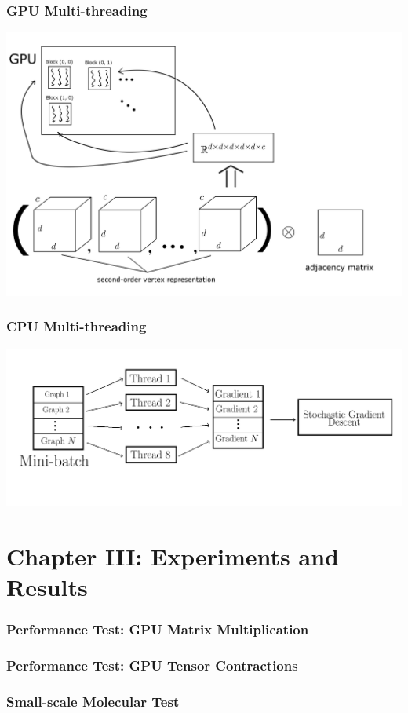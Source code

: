 \documentclass{beamer}
\begin{document}
\begin{frame}
\frametitle{GPU Multi-threading}
\includegraphics[width=\textwidth]{GPU_multithreading.png}
\end{frame}

\begin{frame}
\frametitle{CPU Multi-threading}
\includegraphics[width=\textwidth]{CPU_multithreading.png}
\end{frame}

\section{Chapter III: Experiments and Results}

\begin{frame}
\frametitle{Performance Test: GPU Matrix Multiplication}
\end{frame}

\begin{frame}
\frametitle{Performance Test: GPU Tensor Contractions}
\end{frame}

\begin{frame}
\frametitle{Small-scale Molecular Test}
\end{frame}
\end{document}
